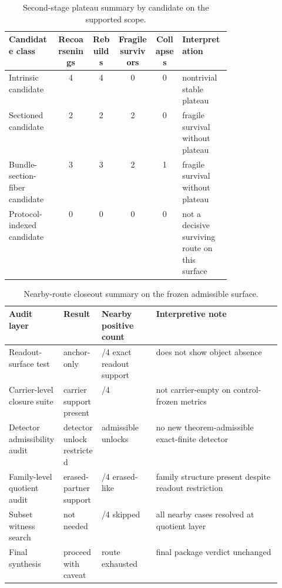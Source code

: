 \documentclass[11pt]{article}
\theoremstyle{definition}
\begin{document}
\begin{table}[htbp]
\centering
\small
\begin{tabularx}{\linewidth}{@{}>{\raggedright\arraybackslash}p{0.22\linewidth} c c c c >{\raggedright\arraybackslash}p{0.22\linewidth}@{}}
\toprule
Candidate class & Recoarsenings & Rebuilds & Fragile survivors & Collapses & Interpretation \\
\midrule
Intrinsic candidate & 4 & 4 & 0 & 0 & nontrivial stable plateau \\
Sectioned candidate & 2 & 2 & 2 & 0 & fragile survival without plateau \\
Bundle-section-fiber candidate & 3 & 3 & 2 & 1 & fragile survival without plateau \\
Protocol-indexed candidate & 0 & 0 & 0 & 0 & not a decisive surviving route on this surface \\
\bottomrule
\end{tabularx}
\caption{Second-stage plateau summary by candidate on the supported scope.}
\label{tab:appendix-plateau-summary}
\end{table}

\begin{table}[htbp]
\centering
\small
\begin{tabularx}{\linewidth}{@{}>{\raggedright\arraybackslash}p{0.20\linewidth}>{\raggedright\arraybackslash}p{0.14\linewidth}>{\raggedright\arraybackslash}p{0.20\linewidth}>{\raggedright\arraybackslash}X@{}}
\toprule
Audit layer & Result & Nearby positive count & Interpretive note \\
\midrule
Readout-surface test & anchor-only & 0/4 exact readout support & does not show object absence \\
Carrier-level closure suite & carrier support present & 4/4 & not carrier-empty on control-frozen metrics \\
Detector admissibility audit & detector unlock restricted & 0 admissible unlocks & no new theorem-admissible exact-finite detector \\
Family-level quotient audit & erased-partner support & 4/4 erased-like & family structure present despite readout restriction \\
Subset witness search & not needed & 4/4 skipped & all nearby cases resolved at quotient layer \\
Final synthesis & proceed with caveat & route exhausted & final package verdict unchanged \\
\bottomrule
\end{tabularx}
\caption{Nearby-route closeout summary on the frozen admissible surface.}
\label{tab:appendix-nearby-closeout}
\end{table}
 
\clearpage


\end{document}
